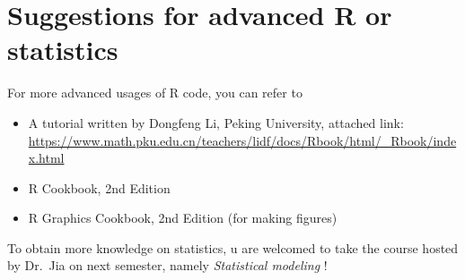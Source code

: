 \documentclass{article}
\begin{document}
\hypertarget{suggestions-for-advanced-r-or-statistics}{%
\section{Suggestions for advanced R or
statistics}\label{suggestions-for-advanced-r-or-statistics}}

For more advanced usages of R code, you can refer to

\begin{itemize}
\tightlist
\item
  A tutorial written by Dongfeng Li, Peking University, attached link:
  \url{https://www.math.pku.edu.cn/teachers/lidf/docs/Rbook/html/_Rbook/index.html}
\item
  R Cookbook, 2nd Edition
\item
  R Graphics Cookbook, 2nd Edition (for making figures)
\end{itemize}

To obtain more knowledge on statistics, u are welcomed to take the
course hosted by Dr.~Jia on next semester, namely \emph{Statistical
modeling} !



\end{document}
